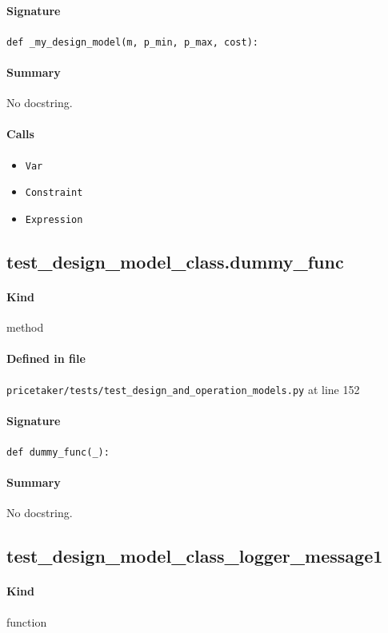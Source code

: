 \documentclass[11pt]{report}
\begin{document}
\paragraph{Signature} \texttt{def \_my\_design\_model(m, p\_min, p\_max, cost):}
\paragraph{Summary} No docstring.
\paragraph{Calls}
\begin{itemize}[leftmargin=*]
  \item \texttt{Var}
  \item \texttt{Constraint}
  \item \texttt{Expression}
\end{itemize}
\subsection{test\_design\_model\_class.dummy\_func}
\label{def:pricetaker-tests-test_design_and_operation_models.py:test_design_model_class.dummy_func:L152}
\paragraph{Kind} method
\paragraph{Defined in file} \texttt{pricetaker/tests/test\_design\_and\_operation\_models.py} at line 152
\paragraph{Signature} \texttt{def dummy\_func(\_):}
\paragraph{Summary} No docstring.
\subsection{test\_design\_model\_class\_logger\_message1}
\label{def:pricetaker-tests-test_design_and_operation_models.py:test_design_model_class_logger_message1:L170}
\paragraph{Kind} function
\end{document}
